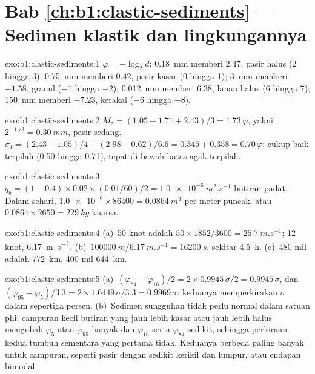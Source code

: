 \section*{Bab \ref{ch:b1:clastic-sediments} --- Sedimen klastik dan lingkungannya}

\begin{solution}{exo:b1:clastic-sediments:1}
$\varphi = -\log_2 d$: \qty{0.18}{mm} memberi $2.47$, pasir halus (2 hingga 3);
\qty{0.75}{mm} memberi $0.42$, pasir kasar (0 hingga 1); \qty{3}{mm} memberi
$-1.58$, granul ($-1$ hingga $-2$); \qty{0.012}{mm} memberi $6.38$, lanau halus (6
hingga 7); \qty{150}{mm} memberi $-7.23$, kerakal ($-6$ hingga $-8$).
\end{solution}

\begin{solution}{exo:b1:clastic-sediments:2}
$M_z = (1.05 + 1.71 + 2.43)/3 = 1.73\,\varphi$, yakni $2^{-1.73} =
\qty{0.30}{mm}$, pasir sedang. $\sigma_I = (2.43 - 1.05)/4 + (2.98 - 0.62)/6.6
= 0.345 + 0.358 = 0.70\,\varphi$: cukup baik terpilah (0.50 hingga 0.71), tepat
di bawah batas agak terpilah.
\end{solution}

\begin{solution}{exo:b1:clastic-sediments:3}
$q_b = (1 - 0.4) \times 0.02 \times (\num{0.01}/60)/2 = \qty{1.0e-6}{m^2.s^{-1}}$
butiran padat. Dalam sehari, $\num{1.0e-6} \times 86400 = \qty{0.0864}{m^3}$ per
meter puncak, atau $0.0864 \times 2650 = \qty{229}{kg}$ kuarsa.
\end{solution}

\begin{solution}{exo:b1:clastic-sediments:4}
(a)~50 knot adalah $50 \times 1852/3600 = \qty{25.7}{m.s^{-1}}$; 12 knot,
\qty{6.17}{m.s^{-1}}. (b)~$\qty{100000}{m}/\qty{6.17}{m.s^{-1}} =
\qty{16200}{s}$, sekitar \qty{4.5}{h}. (c)~480 mil adalah \qty{772}{km}, 400 mil
\qty{644}{km}.
\end{solution}

\begin{solution}{exo:b1:clastic-sediments:5}
(a)~$(\varphi_{84} - \varphi_{16})/2 = 2 \times 0.9945\,\sigma/2 =
0.9945\,\sigma$, dan $(\varphi_{95} - \varphi_5)/3.3 = 2 \times
1.6449\,\sigma/3.3 = 0.9969\,\sigma$: keduanya memperkirakan $\sigma$ dalam sepertiga persen. (b)~Sedimen sungguhan tidak perlu normal dalam satuan phi: campuran kecil butiran yang jauh lebih kasar atau jauh lebih halus mengubah $\varphi_5$ atau $\varphi_{95}$ banyak dan $\varphi_{16}$ serta $\varphi_{84}$ sedikit, sehingga perkiraan kedua tumbuh sementara yang pertama tidak. Keduanya berbeda paling banyak untuk campuran, seperti pasir dengan sedikit kerikil dan lumpur, atau endapan bimodal.
\end{solution}


